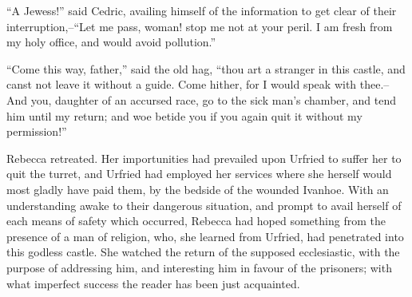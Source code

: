 ``A Jewess!'' said Cedric, availing himself of the information to get
clear of their interruption,--``Let me pass, woman! stop me not at your
peril. I am fresh from my holy office, and would avoid pollution.''

``Come this way, father,'' said the old hag, ``thou art a stranger in
this castle, and canst not leave it without a guide. Come hither, for I
would speak with thee.--And you, daughter of an accursed race, go to the
sick man's chamber, and tend him until my return; and woe betide you if
you again quit it without my permission!''

Rebecca retreated. Her importunities had prevailed upon Urfried to
suffer her to quit the turret, and Urfried had employed her services
where she herself would most gladly have paid them, by the bedside of
the wounded Ivanhoe. With an understanding awake to their dangerous
situation, and prompt to avail herself of each means of safety which
occurred, Rebecca had hoped something from the presence of a man of
religion, who, she learned from Urfried, had penetrated into this
godless castle. She watched the return of the supposed ecclesiastic,
with the purpose of addressing him, and interesting him in favour of the
prisoners; with what imperfect success the reader has been just
acquainted.
